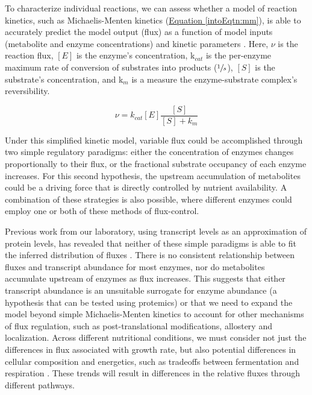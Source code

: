 To characterize individual reactions, we can assess whether a model of reaction kinetics, such as Michaelis-Menten kinetics (\hyperref[intoEqtn:mm]{Equation \ref{intoEqtn:mm}}), is able to accurately predict the model output (flux) as a function of model inputs (metabolite and enzyme concentrations) and kinetic parameters \cite{Anonymous:1913wn, Liebermeister:2006fm, Tummler:2014cp}. Here, $\nu$ is the reaction flux, $\left[E\right]$ is the enzyme's concentration, k$_{cat}$ is the per-enzyme maximum rate of conversion of substrates into products ($\sfrac{1}{s}$), $\left[S\right]$ is the substrate's concentration, and k$_{m}$ is a measure the enzyme-substrate complex's reversibility.

\begin{equation}
\nu = k_{cat}\left[E\right]\frac{\left[S\right]}{\left[S\right] + k_{m}}\label{intoEqtn:mm}
\end{equation}

Under this simplified kinetic model, variable flux could be accomplished through two simple regulatory paradigms: either the concentration of enzymes changes proportionally to their flux, or the fractional substrate occupancy of each enzyme increases. For this second hypothesis, the upstream accumulation of metabolites could be a driving force that is directly controlled by nutrient availability. A combination of these strategies is also possible, where different enzymes could employ one or both of these methods of flux-control. 

Previous work from our laboratory, using transcript levels as an approximation of protein levels, has revealed that neither of these simple paradigms is able to fit the inferred distribution of fluxes \cite{Bradley:2009fj}. There is no consistent relationship between fluxes and transcript abundance for most enzymes, nor do metabolites accumulate upstream of enzymes as flux increases. This suggests that either transcript abundance is an unsuitable surrogate for enzyme abundance (a hypothesis that can be tested using protemics) or that we need to expand the model beyond simple Michaelis-Menten kinetics to account for other mechanisms of flux regulation, such as post-translational modifications, allostery and localization. Across different nutritional conditions, we must consider not just the differences in flux associated with growth rate, but also potential differences in cellular composition and energetics, such as tradeoffs between fermentation and respiration \cite{Lange:2001th, Feist:2010hq, BARFORD:1979ei}. These trends will result in differences in the relative fluxes through different pathways.


